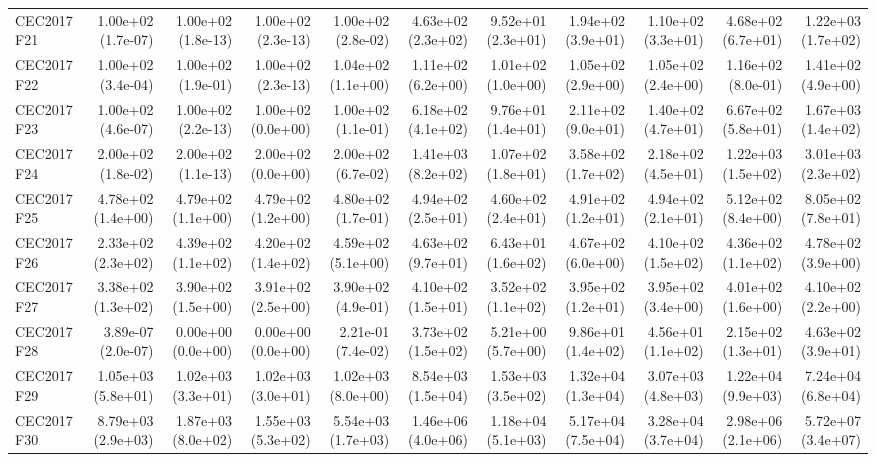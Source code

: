 \begin{longtable}{lrrrrrrrrrr}
CEC2017 F21 & 1.00e+02 (1.7e-07) & 1.00e+02 (1.8e-13) & 1.00e+02 (2.3e-13) & 1.00e+02 (2.8e-02) & 4.63e+02 (2.3e+02) & 9.52e+01 (2.3e+01) & 1.94e+02 (3.9e+01) & 1.10e+02 (3.3e+01) & 4.68e+02 (6.7e+01) & 1.22e+03 (1.7e+02) \\
CEC2017 F22 & 1.00e+02 (3.4e-04) & 1.00e+02 (1.9e-01) & 1.00e+02 (2.3e-13) & 1.04e+02 (1.1e+00) & 1.11e+02 (6.2e+00) & 1.01e+02 (1.0e+00) & 1.05e+02 (2.9e+00) & 1.05e+02 (2.4e+00) & 1.16e+02 (8.0e-01) & 1.41e+02 (4.9e+00) \\
CEC2017 F23 & 1.00e+02 (4.6e-07) & 1.00e+02 (2.2e-13) & 1.00e+02 (0.0e+00) & 1.00e+02 (1.1e-01) & 6.18e+02 (4.1e+02) & 9.76e+01 (1.4e+01) & 2.11e+02 (9.0e+01) & 1.40e+02 (4.7e+01) & 6.67e+02 (5.8e+01) & 1.67e+03 (1.4e+02) \\
CEC2017 F24 & 2.00e+02 (1.8e-02) & 2.00e+02 (1.1e-13) & 2.00e+02 (0.0e+00) & 2.00e+02 (6.7e-02) & 1.41e+03 (8.2e+02) & 1.07e+02 (1.8e+01) & 3.58e+02 (1.7e+02) & 2.18e+02 (4.5e+01) & 1.22e+03 (1.5e+02) & 3.01e+03 (2.3e+02) \\
CEC2017 F25 & 4.78e+02 (1.4e+00) & 4.79e+02 (1.1e+00) & 4.79e+02 (1.2e+00) & 4.80e+02 (1.7e-01) & 4.94e+02 (2.5e+01) & 4.60e+02 (2.4e+01) & 4.91e+02 (1.2e+01) & 4.94e+02 (2.1e+01) & 5.12e+02 (8.4e+00) & 8.05e+02 (7.8e+01) \\
CEC2017 F26 & 2.33e+02 (2.3e+02) & 4.39e+02 (1.1e+02) & 4.20e+02 (1.4e+02) & 4.59e+02 (5.1e+00) & 4.63e+02 (9.7e+01) & 6.43e+01 (1.6e+02) & 4.67e+02 (6.0e+00) & 4.10e+02 (1.5e+02) & 4.36e+02 (1.1e+02) & 4.78e+02 (3.9e+00) \\
CEC2017 F27 & 3.38e+02 (1.3e+02) & 3.90e+02 (1.5e+00) & 3.91e+02 (2.5e+00) & 3.90e+02 (4.9e-01) & 4.10e+02 (1.5e+01) & 3.52e+02 (1.1e+02) & 3.95e+02 (1.2e+01) & 3.95e+02 (3.4e+00) & 4.01e+02 (1.6e+00) & 4.10e+02 (2.2e+00) \\
CEC2017 F28 & 3.89e-07 (2.0e-07) & 0.00e+00 (0.0e+00) & 0.00e+00 (0.0e+00) & 2.21e-01 (7.4e-02) & 3.73e+02 (1.5e+02) & 5.21e+00 (5.7e+00) & 9.86e+01 (1.4e+02) & 4.56e+01 (1.1e+02) & 2.15e+02 (1.3e+01) & 4.63e+02 (3.9e+01) \\
CEC2017 F29 & 1.05e+03 (5.8e+01) & 1.02e+03 (3.3e+01) & 1.02e+03 (3.0e+01) & 1.02e+03 (8.0e+00) & 8.54e+03 (1.5e+04) & 1.53e+03 (3.5e+02) & 1.32e+04 (1.3e+04) & 3.07e+03 (4.8e+03) & 1.22e+04 (9.9e+03) & 7.24e+04 (6.8e+04) \\
CEC2017 F30 & 8.79e+03 (2.9e+03) & 1.87e+03 (8.0e+02) & 1.55e+03 (5.3e+02) & 5.54e+03 (1.7e+03) & 1.46e+06 (4.0e+06) & 1.18e+04 (5.1e+03) & 5.17e+04 (7.5e+04) & 3.28e+04 (3.7e+04) & 2.98e+06 (2.1e+06) & 5.72e+07 (3.4e+07) \\

\end{longtable}
